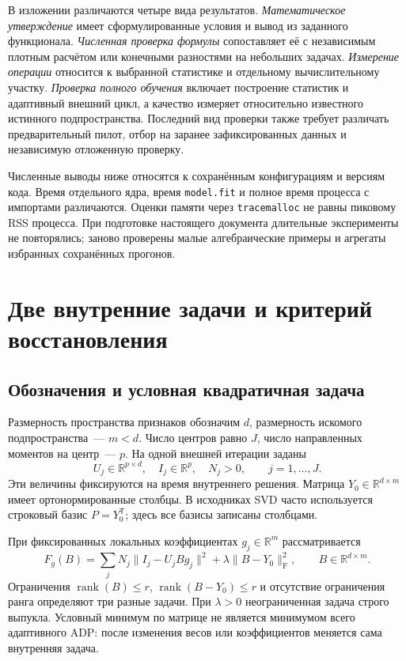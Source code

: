 \documentclass[11pt,a4paper]{article}
\numberwithin{equation}{section}
\newcommand{\R}{\mathbb R}
\newcommand{\T}{^{\mathsf T}}
\newcommand{\F}{_{\mathrm F}}
\newcommand{\file}[1]{\nolinkurl{#1}}
\DeclareMathOperator{\rank}{rank}
\begin{document}
В изложении различаются четыре вида результатов.
\emph{Математическое утверждение} имеет сформулированные условия
и вывод из заданного функционала. \emph{Численная проверка формулы}
сопоставляет её с независимым плотным расчётом или конечными разностями
на небольших задачах. \emph{Измерение операции} относится к выбранной
статистике и отдельному вычислительному участку. \emph{Проверка полного
обучения} включает построение статистик и адаптивный внешний цикл,
а качество измеряет относительно известного истинного подпространства.
Последний вид проверки также требует различать предварительный пилот,
отбор на заранее зафиксированных данных и независимую отложенную проверку.

Численные выводы ниже относятся к сохранённым конфигурациям и версиям
кода. Время отдельного ядра, время \file{model.fit} и полное время процесса
с импортами различаются. Оценки памяти через \file{tracemalloc} не равны
пиковому RSS процесса. При подготовке настоящего документа длительные
эксперименты не повторялись; заново проверены малые алгебраические примеры
и агрегаты избранных сохранённых прогонов.

\section{Две внутренние задачи и критерий восстановления}
\label{sec:problems}

\subsection{Обозначения и условная квадратичная задача}

Размерность пространства признаков обозначим $d$, размерность искомого
подпространства~--- $m<d$. Число центров равно $J$, число направленных
моментов на центр~--- $p$. На одной внешней итерации заданы
\[
 U_j\in\R^{p\times d},\quad I_j\in\R^p,\quad N_j>0,
 \qquad j=1,\ldots,J.
\]
Эти величины фиксируются на время внутреннего решения. Матрица
$Y_0\in\R^{d\times m}$ имеет ортонормированные столбцы. В исходниках
SVD часто используется строковый базис $P=Y_0\T$; здесь все базисы
записаны столбцами.

При фиксированных локальных коэффициентах $g_j\in\R^m$ рассматривается
\begin{equation}\label{eq:fixed}
 F_g(B)=\sum_jN_j\|I_j-U_jBg_j\|^2
             +\lambda\|B-Y_0\|\F^2,
 \qquad B\in\R^{d\times m}.
\end{equation}
Ограничения $\rank(B)\le r$, $\rank(B-Y_0)\le r$ и отсутствие
ограничения ранга определяют три разные задачи. При $\lambda>0$
неограниченная задача строго выпукла. Условный минимум по матрице
не является минимумом всего адаптивного ADP: после изменения весов
или коэффициентов меняется сама внутренняя задача.\cite{svd,algorithm}
\end{document}
